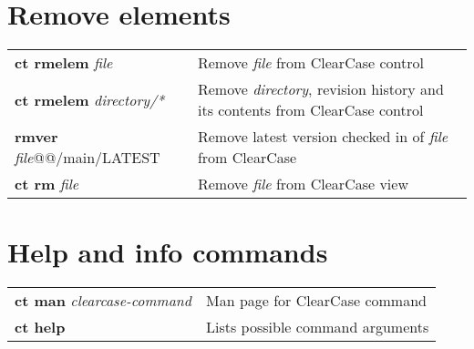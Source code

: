\documentclass[10pt,twocolumn]{article}
\begin{document}
\section*{Remove elements}
\begin{tabularx}{10.2cm}{l|X}
 \textbf{ct rmelem} \textit{file} & Remove \textit{file} from ClearCase control \\ 
 \textbf{ct rmelem} \textit{directory/*} & Remove \textit{directory}, revision history and its contents from ClearCase control \\
 \textbf{rmver} \textit{file}@@/main/LATEST & Remove latest version checked in of \textit{file} from ClearCase \\
 \textbf{ct rm} \textit{file} & Remove \textit{file} from ClearCase view \\
\end{tabularx}

\section*{Help and info commands}
\begin{tabularx}{10.2cm}{l|X}
 \textbf{ct man} \textit{clearcase-command} & Man page for ClearCase command \\ 
 \textbf{ct help}                           & Lists possible command arguments \\
\end{tabularx}
\end{document}
